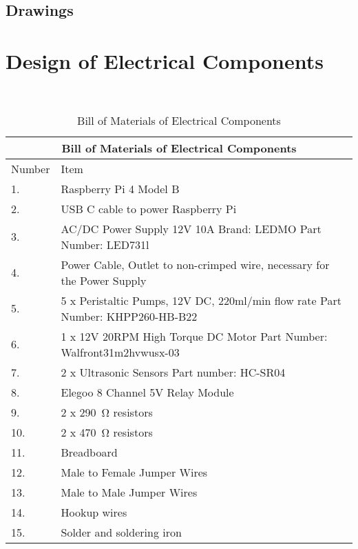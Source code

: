 \documentclass[12pt, titlepage]{article}
\begin{document}
\subsection{Drawings}

\section{Design of Electrical Components}
\\ 
\begin{table}[H]
    \begin{tabular}{|p{3cm}|p{13cm}|}
       \hline
        \multicolumn{2}{|c|}{Bill of Materials of Electrical Components} \\
        \hline
        Number & Item \\ [0.5ex] 
        \hline\hline
        1. & Raspberry Pi 4 Model B \\
        \hline
        2. & USB C cable to power Raspberry Pi \\
        \hline
        3. & AC/DC Power Supply 12V 10A Brand: LEDMO Part Number: LED731l \\
        \hline        
        4. & Power Cable, Outlet to non-crimped wire, necessary for the Power Supply\\
        \hline        
        5. & 5 x Peristaltic Pumps, 12V DC, 220ml/min flow rate Part Number: KHPP260-HB-B22 \\
        \hline 
        6. & 1 x 12V 20RPM High Torque DC Motor Part Number: Walfront31m2hvwusx-03 \\
        \hline        
        7. & 2 x Ultrasonic Sensors Part number: HC-SR04 \\
        \hline        
        8. & Elegoo 8 Channel 5V Relay Module\\
        \hline
        9. & 2 x \qty{290}{\ohm} resistors \\
        \hline
        10. & 2 x \qty{470}{\ohm} resistors \\
        \hline        
        11. & Breadboard \\
        \hline        
        12. & Male to Female Jumper Wires \\
        \hline
        13. & Male to Male Jumper Wires\\
        \hline        
        14. & Hookup wires\\
        \hline        
        15. & Solder and soldering iron \\
        \hline        
    \end{tabular}
    \caption{Bill of Materials of Electrical Components}
    \label{tab: caption}
\end{table}
\end{document}
